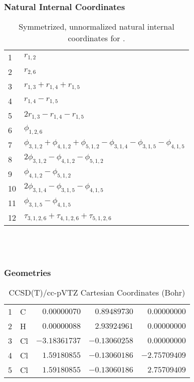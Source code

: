 \documentclass[10pt,oneside]{article}
\begin{document}
\subsubsection*{Natural Internal Coordinates}
\begin{table}[h!]
\centering
\caption{Symmetrized, unnormalized natural internal coordinates for .}
\small
\begin{tabular}{ll}
  1   & $r_{1,2}$ \\
  2   & $r_{2,6}$ \\
  3   & $r_{1,3} + r_{1,4} + r_{1,5}$ \\
  4   & $r_{1,4} - r_{1,5}$ \\
  5   & $2r_{1,3} - r_{1,4} - r_{1,5}$ \\
  6   & $\phi_{1,2,6}$ \\
  7   & $\phi_{3,1,2} + \phi_{4,1,2} + \phi_{5,1,2} - \phi_{3,1,4} - \phi_{3,1,5} - \phi_{4,1,5}$ \\
  8   & $2\phi_{3,1,2} - \phi_{4,1,2} - \phi_{5,1,2}$ \\
  9   & $\phi_{4,1,2} - \phi_{5,1,2}$ \\
  10  & $2\phi_{3,1,4} - \phi_{3,1,5} - \phi_{4,1,5}$ \\
  11  & $\phi_{3,1,5} - \phi_{4,1,5}$ \\
  12  & $\tau_{3,1,2,6} + \tau_{4,1,2,6} + \tau_{5,1,2,6}$ \\
\end{tabular}
\end{table}

\clearpage

\subsection{\ \ \ }

\subsubsection*{Geometries}
\begin{table}[h!]
\centering
\caption{CCSD(T)/cc-pVTZ Cartesian Coordinates (Bohr)}
\begin{tabular}{llrrr}
1  & C  & $ 0.00000070$ & $ 0.89489730$ & $ 0.00000000$ \\
2  & H  & $ 0.00000088$ & $ 2.93924961$ & $ 0.00000000$ \\
3  & Cl & $-3.18361737$ & $-0.13060258$ & $ 0.00000000$ \\
4  & Cl & $ 1.59180855$ & $-0.13060186$ & $-2.75709409$ \\
5  & Cl & $ 1.59180855$ & $-0.13060186$ & $ 2.75709409$ \\
\end{tabular}
\end{table}
\end{document}
